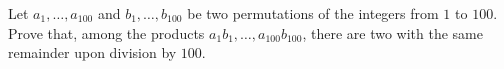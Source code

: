 Let $a_1, \ldots, a_{100}$ and $b_1, \ldots, b_{100}$ be two permutations of the integers from $1$ to $100$. Prove that, among the products $a_1b_1, \ldots, a_{100}b_{100}$, there are two with the same remainder upon division by $100$.
